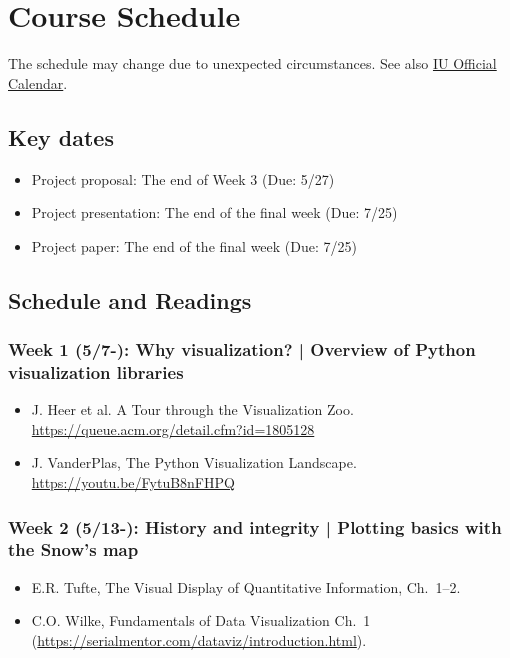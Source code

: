 \documentclass[11pt,article,oneside]{memoir} %
\begin{document}
\section{Course Schedule}%

The schedule may change due to unexpected circumstances. See also \href{https://registrar.indiana.edu/official-calendar/official-calendar-summer.shtml}{IU Official Calendar}. 

\subsection{Key dates}\label{sub:key_dates} %

\begin{itemize} %
\item Project proposal: The end of Week 3 (Due: 5/27)
\item Project presentation: The end of the final week (Due: 7/25)
\item Project paper: The end of the final week (Due: 7/25)
\end{itemize} %

\subsection{Schedule and Readings}\label{sub:schedule}%

\subsubsection{Week 1 (5/7-): Why visualization? | Overview of Python visualization libraries} %

\begin{itemize}\itemsep0em 
\item J. Heer et al. A Tour through the Visualization Zoo. \url{https://queue.acm.org/detail.cfm?id=1805128}
\item J. VanderPlas, The Python Visualization Landscape. \url{https://youtu.be/FytuB8nFHPQ}
\end{itemize}	
\subsubsection{Week 2 (5/13-): History and integrity | Plotting basics with the Snow's map }%

\begin{itemize}\itemsep0em 
\item E.R. Tufte, The Visual Display of Quantitative Information, Ch.~1--2.
\item C.O. Wilke, Fundamentals of Data Visualization Ch.~1 (\url{https://serialmentor.com/dataviz/introduction.html}). 
\end{itemize}	
\end{document}

